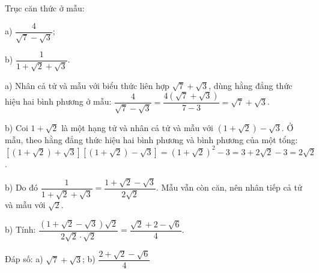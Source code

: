 \begin{problem}[9DS-CAN-046]
Trục căn thức ở mẫu:

a) $\dfrac{4}{\sqrt{7} - \sqrt{3}}$;

b) $\dfrac{1}{1 + \sqrt{2} + \sqrt{3}}$.

\begin{solution}
a) Nhân cả tử và mẫu với biểu thức liên hợp $\sqrt{7} + \sqrt{3}$, dùng hằng đẳng thức hiệu hai bình phương ở mẫu: $\dfrac{4}{\sqrt{7} - \sqrt{3}} = \dfrac{4(\sqrt{7} + \sqrt{3})}{7 - 3} = \sqrt{7} + \sqrt{3}$.

b) Coi $1 + \sqrt{2}$ là một hạng tử và nhân cả tử và mẫu với $(1 + \sqrt{2}) - \sqrt{3}$. Ở mẫu, theo hằng đẳng thức hiệu hai bình phương và bình phương của một tổng: $\left[(1 + \sqrt{2}) + \sqrt{3}\right]\left[(1 + \sqrt{2}) - \sqrt{3}\right] = (1 + \sqrt{2})^2 - 3 = 3 + 2\sqrt{2} - 3 = 2\sqrt{2}$.

b) Do đó $\dfrac{1}{1 + \sqrt{2} + \sqrt{3}} = \dfrac{1 + \sqrt{2} - \sqrt{3}}{2\sqrt{2}}$. Mẫu vẫn còn căn, nên nhân tiếp cả tử và mẫu với $\sqrt{2}$.

b) Tính: $\dfrac{(1 + \sqrt{2} - \sqrt{3})\sqrt{2}}{2\sqrt{2} \cdot \sqrt{2}} = \dfrac{\sqrt{2} + 2 - \sqrt{6}}{4}$.

Đáp số: a) $\boxed{\sqrt{7} + \sqrt{3}}$; b) $\boxed{\dfrac{2 + \sqrt{2} - \sqrt{6}}{4}}$
\end{solution}
\end{problem}

